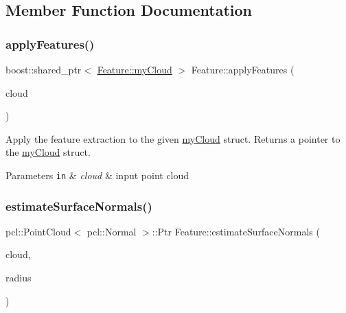 \subsection{Member Function Documentation}
\hypertarget{class_feature_acf2008a37df967514cb04d0598aa1c79}{}\label{class_feature_acf2008a37df967514cb04d0598aa1c79} 
\subsubsection{\texorpdfstring{apply\+Features()}{applyFeatures()}}
{\footnotesize\ttfamily boost\+::shared\+\_\+ptr$<$ \hyperlink{struct_feature_1_1my_cloud}{Feature\+::my\+Cloud} $>$ Feature\+::apply\+Features (\begin{DoxyParamCaption}\item[{const pcl\+::\+Point\+Cloud$<$ pcl\+::\+Point\+X\+Y\+Z\+R\+GB $>$\+::Ptr \&}]{cloud }\end{DoxyParamCaption})}

Apply the feature extraction to the given \hyperlink{struct_feature_1_1my_cloud}{my\+Cloud} struct. Returns a pointer to the \hyperlink{struct_feature_1_1my_cloud}{my\+Cloud} struct. 
\begin{DoxyParams}[1]{Parameters}
\mbox{\tt in}  & {\em cloud} & input point cloud \\
\hline
\end{DoxyParams}
\hypertarget{class_feature_a2160d57e3a1502d84bd87dd3a3b5da9c}{}\label{class_feature_a2160d57e3a1502d84bd87dd3a3b5da9c} 
\subsubsection{\texorpdfstring{estimate\+Surface\+Normals()}{estimateSurfaceNormals()}}
{\footnotesize\ttfamily pcl\+::\+Point\+Cloud$<$ pcl\+::\+Normal $>$\+::Ptr Feature\+::estimate\+Surface\+Normals (\begin{DoxyParamCaption}\item[{const pcl\+::\+Point\+Cloud$<$ pcl\+::\+Point\+X\+Y\+Z\+R\+GB $>$\+::Ptr \&}]{cloud,  }\item[{float}]{radius }\end{DoxyParamCaption})}


